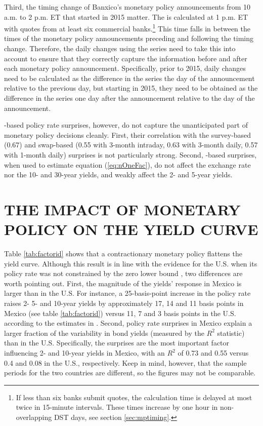 Third, the timing change of Banxico's monetary policy announcements from 10 a.m. to 2 p.m. ET that started in 2015 matter. The \tiie{} is calculated at 1 p.m. ET with quotes from at least six commercial banks.\footnote{ If less than six banks submit quotes, the calculation time is delayed at most twice in 15-minute intervals. These times increase by one hour in non-overlapping DST days, see section \ref{sec:mptiming}.} This time falls in between the times of the monetary policy announcements preceding and following the timing change. Therefore, the daily changes using the \tiie{} series need to take this into account to ensure that they correctly capture the information before and after each monetary policy announcement. Specifically, prior to 2015, daily changes need to be calculated as the difference in the series the day of the announcement relative to the previous day, but starting in 2015, they need to be obtained as the difference in the series one day after the announcement relative to the day of the announcement.

\tiie{}-based policy rate surprises, however, do not capture the unanticipated part of monetary policy decisions cleanly. First, their correlation with the survey-based (0.67) and swap-based (0.55 with 3-month intraday, 0.63 with 3-month daily, 0.57 with 1-month daily) surprises is not particularly strong. 
Second, \tiie{}-based surprises, when used to estimate equation (\ref{eq:nOneFac}), do not affect the exchange rate nor the 10- and 30-year yields, and weakly affect the 2- and 5-year yields. 

\sectitlespace
\section{THE IMPACT OF MONETARY POLICY ON THE YIELD CURVE} \label{sec:yieldcurve}
\sectitlespace

Table \ref{tab:factorid} shows that a contractionary monetary policy flattens the yield curve. Although this result is in line with the evidence for the U.S. when its policy rate was not constrained by the zero lower bound \parencite{Kuttner:2001, GSS:2005a}, two differences are worth pointing out. First, the magnitude of the yields' response in Mexico is larger than in the U.S. For instance, a 25-basis-point increase in the policy rate raises 2- 5- and 10-year yields by approximately 17, 14 and 11 basis points in Mexico (see table \ref{tab:factorid}) versus 11, 7 and 3 basis points in the U.S. according to the estimates in \textcite{GSS:2005a}. Second, policy rate surprises in Mexico explain a larger fraction of the variability in bond yields (measured by the \(R^2\) statistic) than in the U.S. Specifically, the surprises are the most important factor influencing 2- and 10-year yields in Mexico, with an \(R^2\) of 0.73 and 0.55 versus 0.4 and 0.08 in the U.S., respectively. Keep in mind, however, that the sample periods for the two countries are different, so the figures may not be comparable.


